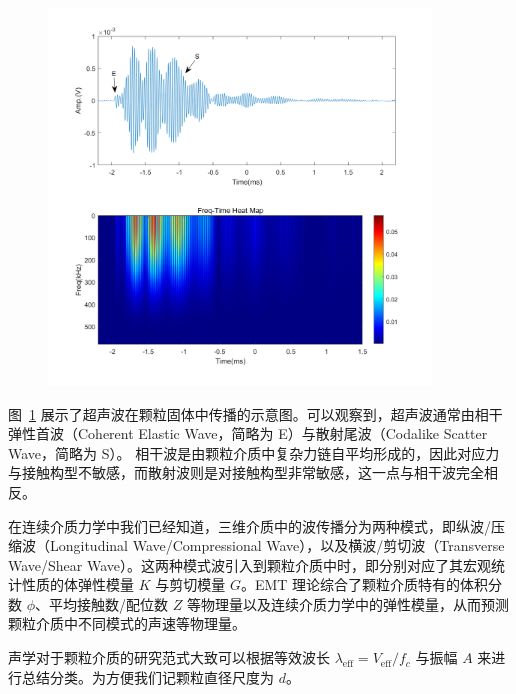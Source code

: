 \begin{figure}[!htp]
  \centering
  \includegraphics[height=10cm]{figures/1_heat_map.png}
  \label{fig:acoustic_signal}
\end{figure}

图~\ref{fig:acoustic_signal} 展示了超声波在颗粒固体中传播的示意图。可以观察到，超声波通常由相干弹性首波（Coherent Elastic Wave，简略为 E）与散射尾波（Codalike Scatter Wave，简略为 S）。 相干波是由颗粒介质中复杂力链自平均形成的，因此对应力与接触构型不敏感，而散射波则是对接触构型非常敏感，这一点与相干波完全相反\cite{PhysRevLett.93.154303}。

在连续介质力学中我们已经知道，三维介质中的波传播分为两种模式，即纵波/压缩波（Longitudinal Wave/Compressional Wave），以及横波/剪切波（Transverse Wave/Shear Wave）。这两种模式波引入到颗粒介质中时，即分别对应了其宏观统计性质的体弹性模量 $K$ 与剪切模量 $G$。EMT 理论综合了颗粒介质特有的体积分数 $\phi$、平均接触数/配位数 $Z$ 等物理量以及连续介质力学中的弹性模量，从而预测颗粒介质中不同模式的声速等物理量。

声学对于颗粒介质的研究范式大致可以根据等效波长 $\lambda_{\text{eff}} = V_{\text{eff}}/f_{c}$ 与振幅 $A$ 来进行总结分类。为方便我们记颗粒直径尺度为 $d$。

